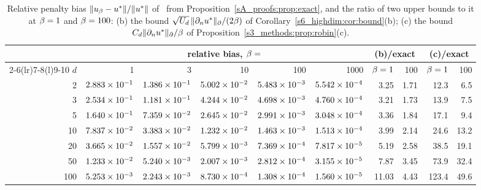\begin{table}[tbp]
\centering
\caption{Relative penalty bias $\lVert u_{\beta}-u^{*}\rVert/\lVert u^{*}\rVert$ of \Pone\ from
Proposition~\ref{sA_proofs:prop:exact}, and the ratio of two upper bounds to it at $\beta=1$ and
$\beta=100$: (b) the bound $\sqrt{U_d}\,\lVert \partial_nu^{*}\rVert_{\partial}/(2\beta)$ of
Corollary~\ref{s6_highdim:cor:bound}(b); (c) the bound $C_d\lVert \partial_nu^{*}\rVert_{\partial}/\beta$ of
Proposition~\ref{s3_methods:prop:robin}(c).}
\label{s6_highdim:tab:biasexact}
\small
\setlength{\tabcolsep}{4pt}
\begin{tabular}{@{}rrrrrrrrrr@{}}
\toprule
& \multicolumn{5}{c}{relative bias, $\beta=$} & \multicolumn{2}{c}{(b)/exact} & \multicolumn{2}{c}{(c)/exact}\\
\cmidrule(lr){2-6}\cmidrule(lr){7-8}\cmidrule(l){9-10}
$d$ & 1 & 3 & 10 & 100 & 1000 & $\beta=1$ & 100 & $\beta=1$ & 100\\
\midrule
2 & $2.883\times 10^{-1}$ & $1.386\times 10^{-1}$ & $5.002\times 10^{-2}$ & $5.483\times 10^{-3}$ & $5.542\times 10^{-4}$ & 3.25 & 1.71 & 12.3 & 6.5 \\
3 & $2.534\times 10^{-1}$ & $1.181\times 10^{-1}$ & $4.244\times 10^{-2}$ & $4.698\times 10^{-3}$ & $4.760\times 10^{-4}$ & 3.21 & 1.73 & 13.9 & 7.5 \\
5 & $1.640\times 10^{-1}$ & $7.359\times 10^{-2}$ & $2.645\times 10^{-2}$ & $2.991\times 10^{-3}$ & $3.048\times 10^{-4}$ & 3.36 & 1.84 & 17.1 & 9.4 \\
10 & $7.837\times 10^{-2}$ & $3.383\times 10^{-2}$ & $1.232\times 10^{-2}$ & $1.463\times 10^{-3}$ & $1.513\times 10^{-4}$ & 3.99 & 2.14 & 24.6 & 13.2 \\
20 & $3.665\times 10^{-2}$ & $1.557\times 10^{-2}$ & $5.799\times 10^{-3}$ & $7.369\times 10^{-4}$ & $7.817\times 10^{-5}$ & 5.19 & 2.58 & 38.5 & 19.1 \\
50 & $1.233\times 10^{-2}$ & $5.240\times 10^{-3}$ & $2.007\times 10^{-3}$ & $2.812\times 10^{-4}$ & $3.155\times 10^{-5}$ & 7.87 & 3.45 & 73.9 & 32.4 \\
100 & $5.253\times 10^{-3}$ & $2.243\times 10^{-3}$ & $8.730\times 10^{-4}$ & $1.308\times 10^{-4}$ & $1.560\times 10^{-5}$ & 11.03 & 4.43 & 123.4 & 49.6 \\
\bottomrule
\end{tabular}
\end{table}

